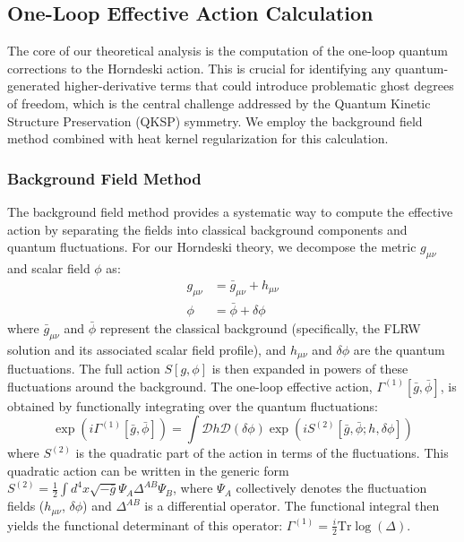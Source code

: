 \documentclass[twocolumn]{aastex631}
\begin{document}
\subsection{One-Loop Effective Action Calculation}
The core of our theoretical analysis is the computation of the one-loop quantum corrections to the Horndeski action. This is crucial for identifying any quantum-generated higher-derivative terms that could introduce problematic ghost degrees of freedom, which is the central challenge addressed by the Quantum Kinetic Structure Preservation (QKSP) symmetry. We employ the background field method combined with heat kernel regularization for this calculation.

\subsubsection{Background Field Method}
The background field method provides a systematic way to compute the effective action by separating the fields into classical background components and quantum fluctuations. For our Horndeski theory, we decompose the metric $g_{\mu\nu}$ and scalar field $\phi$ as:
\begin{align*}
g_{\mu\nu} &= \bar{g}_{\mu\nu} + h_{\mu\nu} \\
\phi &= \bar{\phi} + \delta\phi
\end{align*}
where $\bar{g}_{\mu\nu}$ and $\bar{\phi}$ represent the classical background (specifically, the FLRW solution and its associated scalar field profile), and $h_{\mu\nu}$ and $\delta\phi$ are the quantum fluctuations. The full action $S[g, \phi]$ is then expanded in powers of these fluctuations around the background. The one-loop effective action, $\Gamma^{(1)}[\bar{g}, \bar{\phi}]$, is obtained by functionally integrating over the quantum fluctuations:
\begin{equation}
\exp(i\Gamma^{(1)}[\bar{g}, \bar{\phi}]) = \int \mathcal{D}h \mathcal{D}(\delta\phi) \exp(i S^{(2)}[\bar{g}, \bar{\phi}; h, \delta\phi])
\end{equation}
where $S^{(2)}$ is the quadratic part of the action in terms of the fluctuations. This quadratic action can be written in the generic form $S^{(2)} = \frac{1}{2} \int d^4x \sqrt{-\bar{g}} \Psi_A \Delta^{AB} \Psi_B$, where $\Psi_A$ collectively denotes the fluctuation fields ($h_{\mu\nu}$, $\delta\phi$) and $\Delta^{AB}$ is a differential operator. The functional integral then yields the functional determinant of this operator: $\Gamma^{(1)} = \frac{i}{2} \text{Tr} \log(\Delta)$.
\end{document}
